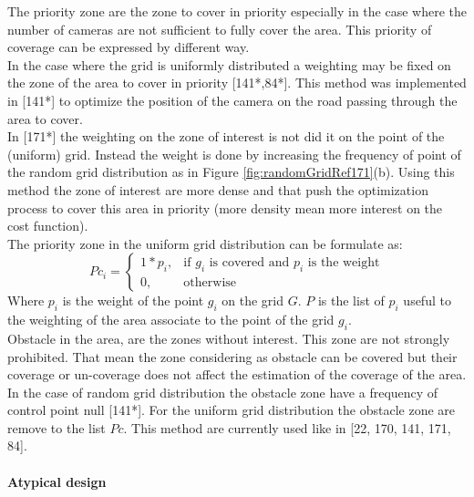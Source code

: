 The priority zone are the zone to cover in priority especially in the case where the number of cameras are not sufficient to fully cover the area. This priority of coverage can be expressed by different way. \\
In the case where the grid is uniformly distributed a weighting may be fixed on the zone of the area to cover in priority [141*,84*]. This method was implemented in [141*]  to optimize the position of the camera on the road passing through the area to cover. \\
In [171*] the weighting on the zone of interest is not did it on the point of the (uniform) grid. Instead the weight is done by increasing the frequency of point of the random grid distribution as in Figure \ref{fig:randomGridRef171}(b). Using this method the zone of interest are more dense and that push the optimization process to cover this area in priority (more density mean more interest on the cost function).\\
The priority zone in the uniform grid distribution can be formulate as: 
  \begin{equation}\label{eq:PciP}
Pc_i= \begin{cases} 1*p_i, & \mbox{if } g_i\mbox{ is covered and  $p_i$ is the weight} \\ 0, & \mbox{otherwise}  \end{cases}
\end{equation}
Where $p_i$ is the weight of the point $g_i$ on the grid $G$. $P $ is the list of $p_i$ useful to the weighting of the area associate to the point of the grid $g_i$. \\

Obstacle in the area, are the zones without interest. This zone are not strongly prohibited. That mean the zone considering as obstacle can be covered but their coverage or un-coverage does not affect the estimation of the coverage of the area. In the case of random grid distribution the obstacle zone have a frequency of control point null [141*]. For the uniform grid distribution the obstacle zone are remove to the list $Pc$. This method are currently used like in [22, 170, 141, 171, 84].

\paragraph*{Atypical design}  

